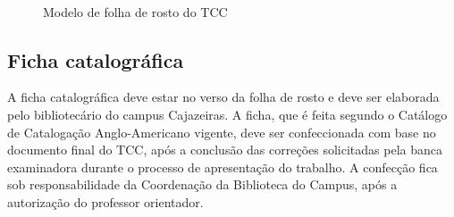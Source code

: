 \begin{center}
\begin{figure}[H]
	\vspace*{0,1cm}
	\centering
	\caption{Modelo de folha de rosto do TCC}
    \label{fig:rosto}
    {}\\
\end{figure}
\end{center}

\subsection{Ficha catalográfica}

A ficha catalográfica deve estar no verso da folha de rosto e deve ser elaborada pelo bibliotecário do campus Cajazeiras. A ficha, que é feita segundo o Catálogo de Catalogação Anglo-Americano vigente,  deve ser confeccionada com base no documento final do TCC, após a conclusão das correções solicitadas pela banca examinadora durante o processo de apresentação do trabalho. A confecção fica sob responsabilidade da Coordenação da Biblioteca do Campus, após a autorização do professor orientador.

